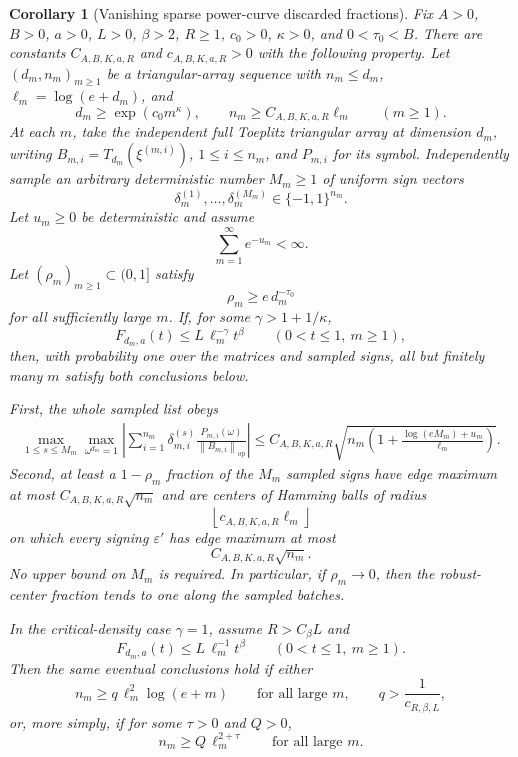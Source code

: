\documentclass[11pt]{amsart}
\numberwithin{equation}{section}
\newtheorem{corollary}[theorem]{Corollary}
\theoremstyle{definition}
\theoremstyle{remark}
\newcommand{\op}{\mathrm{op}}
\newcommand{\norm}[1]{\left\lVert #1\right\rVert}
\newcommand{\eps}{\varepsilon}
\begin{document}
\begin{corollary}[Vanishing sparse power-curve discarded fractions]
\label{cor:normalizer-tail-power-borel-window-vanishing-fractions}
Fix \(A>0\), \(B>0\), \(a>0\), \(L>0\), \(\beta>2\), \(R\ge1\),
\(c_0>0\), \(\kappa>0\), and \(0<\tau_0<B\).  There are constants
\(C_{A,B,K,a,R}\) and \(c_{A,B,K,a,R}>0\) with the following property.  Let
\((d_m,n_m)_{m\ge1}\) be a triangular-array sequence with \(n_m\le d_m\),
\(\ell_m=\log(e+d_m)\), and
\[
  d_m\ge \exp(c_0m^\kappa),\qquad
  n_m\ge C_{A,B,K,a,R}\ell_m
  \qquad(m\ge1).
\]
At each \(m\), take the independent full Toeplitz triangular array at dimension
\(d_m\), writing \(B_{m,i}=T_{d_m}(\xi^{(m,i)})\), \(1\le i\le n_m\), and
\(P_{m,i}\) for its symbol.  Independently sample an arbitrary deterministic
number \(M_m\ge1\) of uniform sign vectors
\[
  \delta_m^{(1)},\ldots,\delta_m^{(M_m)}\in\{-1,1\}^{n_m}.
\]
Let \(u_m\ge0\) be deterministic and assume
\[
  \sum_{m=1}^{\infty}e^{-u_m}<\infty .
\]
Let \((\rho_m)_{m\ge1}\subset(0,1]\) satisfy
\[
  \rho_m\ge e\,d_m^{-\tau_0}
\]
for all sufficiently large \(m\).  If, for some \(\gamma>1+1/\kappa\),
\[
  F_{d_m,a}(t)\le L\,\ell_m^{-\gamma}t^\beta
  \qquad(0<t\le1,\ m\ge1),
\]
then, with probability one over the matrices and sampled signs, all but
finitely many \(m\) satisfy both conclusions below.

First, the whole sampled list obeys
\[
\begin{aligned}
  \max_{1\le s\le M_m}\max_{\omega^{d_m}=1}
  \left|\sum_{i=1}^{n_m}\delta_{m,i}^{(s)}
  \frac{P_{m,i}(\omega)}{\norm{B_{m,i}}_{\op}}\right|
  \le
  C_{A,B,K,a,R}\sqrt{
    n_m\left(1+\frac{\log(eM_m)+u_m}{\ell_m}\right)} .
\end{aligned}
\]
Second, at least a \(1-\rho_m\) fraction of the \(M_m\) sampled signs have edge
maximum at most \(C_{A,B,K,a,R}\sqrt{n_m}\) and are centers of Hamming balls of
radius
\[
  \left\lfloor c_{A,B,K,a,R}\ell_m\right\rfloor
\]
on which every signing \(\eps'\) has edge maximum at most
\[
  C_{A,B,K,a,R}\sqrt{n_m}.
\]
No upper bound on \(M_m\) is required.  In particular, if \(\rho_m\to0\), then
the robust-center fraction tends to one along the sampled batches.

In the critical-density case \(\gamma=1\), assume \(R>C_\beta L\) and
\[
  F_{d_m,a}(t)\le L\,\ell_m^{-1}t^\beta
  \qquad(0<t\le1,\ m\ge1).
\]
Then the same eventual conclusions hold if either
\[
  n_m\ge q\,\ell_m^2\log(e+m)
  \qquad\text{for all large }m,\qquad
  q>\frac1{c_{R,\beta,L}},
\]
or, more simply, if for some \(\tau>0\) and \(Q>0\),
\[
  n_m\ge Q\,\ell_m^{2+\tau}
  \qquad\text{for all large }m .
\]
\end{corollary}
\end{document}
